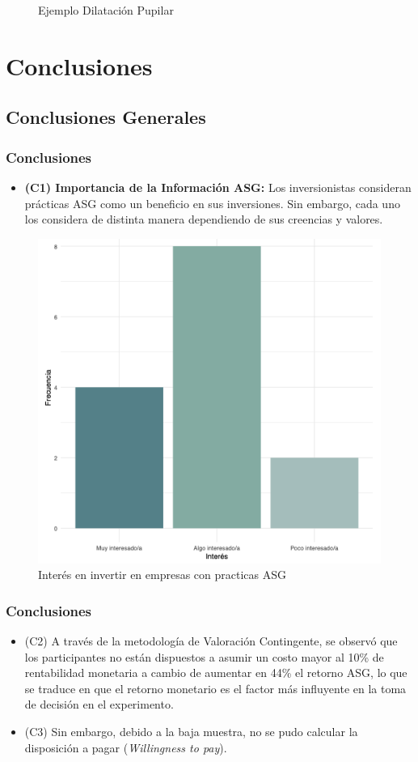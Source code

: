 \documentclass{beamer}
\begin{document}
\begin{frame}
\begin{figure}[h!]
\begin{minipage}{0.4\textwidth}
    \end{minipage}
    \caption{Ejemplo Dilatación Pupilar}
\end{figure}
\end{frame}



\section{Conclusiones}

\subsection{Conclusiones Generales}
\begin{frame}
    \frametitle{Conclusiones}
    \begin{itemize}
        \item \textbf{(C1) Importancia de la Información ASG:} Los inversionistas consideran prácticas ASG como un beneficio en sus inversiones. Sin embargo, cada uno los considera de distinta manera dependiendo de sus creencias y valores.
        
    \end{itemize}
    \begin{figure}
        \centering
        \includegraphics[width=0.4\linewidth]{Latex/defensa/interes_inv_asg.png}
        \caption{Interés en invertir en empresas con practicas ASG}
    \end{figure}
\end{frame}

\begin{frame}
    \frametitle{Conclusiones}
    \begin{itemize}
        
        \item (C2) A través de la metodología de Valoración Contingente, se observó que los participantes no están dispuestos a asumir un costo mayor al 10\% de rentabilidad monetaria a cambio de aumentar en 44\% el retorno ASG, lo que se traduce en que el retorno monetario es el factor más influyente en la toma de decisión en el experimento. 
        \item (C3) Sin embargo, debido a la baja muestra, no se pudo calcular la disposición a pagar (\textit{Willingness to pay}).
    \end{itemize}
\end{frame}
\end{document}
